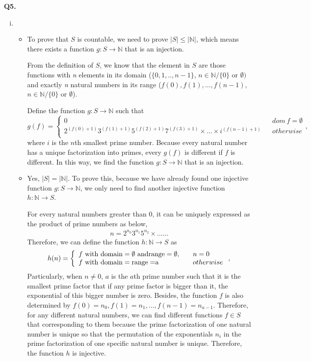 \documentclass{article}[12pt]
\begin{document}
\noindent \textbf{Q5.}
\begin{enumerate}[(i)]
\item 
\begin{itemize}
\item To prove that $S$ is countable, we need to prove $|S|\leq |\mathbb{N}|$, which means there exists a function $g:S\rightarrow \mathbb{N}$ that is an injection.\par
From the definition of $S$, we know that the element in $S$ are those functions with \textit{n} elements in its domain ($\{0,1,..,n-1\}$, $n\in \mathbb{N}/\{0\}$ or $\emptyset)$ and exactly \textit{n} natural numbers in its range ($f(0),f(1),...,f(n-1)$, $n\in \mathbb{N}/\{0\}$ or $\emptyset$).\par
Define the function $g:S\rightarrow \mathbb{N}$ such that 
\begin{equation*}
g(f)=\left\{
\begin{array}{lcl}
0 & & {dom\ f=\emptyset}\\
2^{(f(0)+1)}3^{(f(1)+1)}5^{(f(2)+1)}7^{(f(3)+1)}\times ...\times i^{(f(n-1)+1)} & & {otherwise}\\
\end{array} 
\right.,
\end{equation*}
where $i$ is the $n$th smallest prime number. Because every natural number has a unique factorization into primes, every $g(f)$ is different if $f$ is different. In this way, we find the function $g:S\rightarrow \mathbb{N}$ that is an injection.
\item Yes, $|S|=|\mathbb{N}|$. To prove this, because we have already found one injective function $g:S\rightarrow \mathbb{N}$, we only need to find another injective function $h:\mathbb{N}\rightarrow S$.\par 
For every natural numbers greater than 0, it can be uniquely expressed as the product of prime numbers as below,
\begin{align*}
n=2^{n_0}3^{n_1}5^{n_2}\times ......
\end{align*}
Therefore, we can define the function $h:\mathbb{N}\rightarrow S$ as 
\begin{equation*}
h(n)=\left\{
\begin{array}{lcl}
f\ \rm{with\ domain=\emptyset\ and range= \emptyset}, & & {n=0}\\
f\ \rm{with\ domain=range=}a & & {otherwise}\\
\end{array} 
\right.,
\end{equation*}
Particularly, when $n\not=0$, $a$ is the $a$th prime number such that it is the smallest prime factor that if any prime factor is bigger than it, the exponential of this bigger number is zero. Besides, the function $f$ is also determined by $f(0)=n_0,f(1)=n_1,...,f(n-1)=n_{a-1}$. Therefore, for any different natural numbers, we can find different functions $f\in S$ that corresponding to them because the prime factorization of one natural number is unique so that the permutation of the exponentials $n_i$ in the prime factorization of one specific natural number is unique. Therefore, the function $h$ is injective.\par 

\end{itemize}
\end{enumerate}
\end{document}
